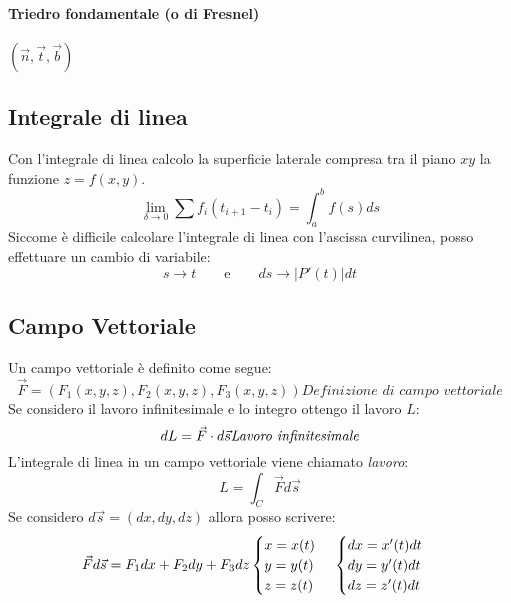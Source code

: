 \documentclass[10pt,a4paper,fleqn]{article}
\begin{document}
	\paragraph{Triedro fondamentale (o di Fresnel)} $(\vec{n}, \vec{t}, \vec{b})$

	\subsection{Integrale di linea}

	Con l'integrale di linea calcolo la superficie laterale compresa tra il piano $xy$ la funzione $z=f(x,y)$.
	\begin{equation}
	\lim_{\delta\to 0}\sum f_i(t_{i+1}-t_i)=\int_a^b f(s)ds
	\end{equation}
	Siccome è difficile calcolare l'integrale di linea con l'ascissa curvilinea, posso effettuare un cambio di variabile:
	\begin{equation}
	s\rightarrow t \qquad \text{e} \qquad ds \rightarrow |P'(t)|dt
	\end{equation}

	\subsection{Campo Vettoriale}

	Un campo vettoriale è definito come segue:
	\begin{equation}
	\vec{F} = (F_1(x,y,z),F_2(x,y,z),F_3(x,y,z))\textit{Definizione di campo vettoriale}
	\end{equation}
	Se considero il lavoro infinitesimale e lo integro ottengo il lavoro $L$:
	\begin{equation}
	dL = \vec{F}\cdot d\vec{s}\textit{Lavoro infinitesimale}\\
	\end{equation}
	L'integrale di linea in un campo vettoriale viene chiamato \emph{lavoro}:
	\begin{equation}
	L=\int_C \vec{F}d\vec{s}
	\end{equation}
	Se considero $d\vec{s}=(dx,dy,dz)$ allora posso scrivere:
	\begin{equation}
	\vec{F}d\vec{s}=F_1dx + F_2dy + F_3dz\\
	\begin{cases}
	x=x(t)\\y=y(t)\\z=z(t)
	\end{cases}\\
	\begin{cases}
	dx=x'(t)dt\\dy=y'(t)dt\\dz=z'(t)dt
	\end{cases}
	\end{equation}
\end{document}
